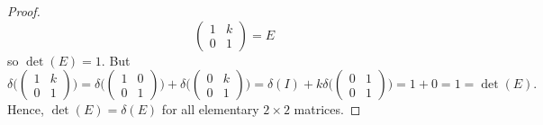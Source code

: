 \documentclass{exam}
\begin{document}
\begin{solution}
\begin{proof}
\[        \begin{pmatrix}
          1 & k \\
          0 & 1
        \end{pmatrix} = E
      \]
      so $\det(E) = 1$. But 
      \[
        \delta\Biggl(\begin{pmatrix}
          1 & k \\
          0 & 1
        \end{pmatrix}\Biggr) 
        = \delta\Biggl(\begin{pmatrix}
          1 & 0 \\
          0 & 1
        \end{pmatrix}\Biggr) 
        + \delta\Biggl(\begin{pmatrix}
          0 & k \\
          0 & 1
        \end{pmatrix}\Biggr)
        = \delta(I) + k\delta\Biggl(\begin{pmatrix}
          0 & 1 \\
          0 & 1
        \end{pmatrix}\Biggr)
        = 1 + 0 = 1 = \det(E).
      \]
      Hence, $\det(E) = \delta(E)$ for all elementary $2 \times 2$ matrices.
    \end{proof}
  \end{solution}
\end{document}
